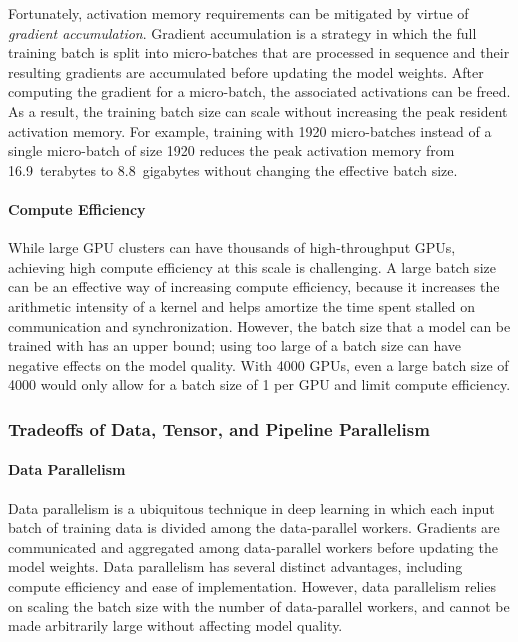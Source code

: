 \documentclass[11pt]{article}
\begin{document}
Fortunately, activation memory requirements can be mitigated by virtue of
\emph{gradient accumulation}. Gradient accumulation is a strategy in which the full training
batch is split into micro-batches that are processed in sequence and their resulting gradients are
accumulated before updating the model weights. After computing the gradient for a micro-batch, the
associated activations can be freed. As a result, the training batch size can scale without
increasing the peak resident activation memory. For example, training with 1920 micro-batches
instead of a single micro-batch of size 1920 reduces the peak activation memory from 16.9~terabytes
to 8.8~gigabytes without changing the effective batch size. 

\paragraph{Compute Efficiency} While large GPU clusters can have thousands of high-throughput
GPUs, achieving high compute efficiency at this scale is challenging. A large batch
size can be an effective way of increasing compute efficiency, because it increases the arithmetic
intensity of a kernel and helps amortize the time spent stalled on communication and synchronization.
However, the batch size that a model can be
trained with has an upper bound; using too large of a batch size can have
negative effects on the model quality. With 4000 GPUs, even a large batch
size of 4000 would only allow for a batch size of 1 per GPU and limit
compute efficiency.


\subsubsection{Tradeoffs of Data, Tensor, and Pipeline Parallelism}

\paragraph{Data Parallelism}
Data parallelism is a ubiquitous technique in deep learning in which
each input batch of training data is divided among the data-parallel workers.
Gradients are communicated and aggregated among data-parallel workers before
updating the model weights.
Data parallelism has
several distinct advantages, including compute efficiency and ease of implementation. However, data parallelism relies on scaling the batch
size with the number of data-parallel workers, and cannot be made arbitrarily
large without affecting model quality.
\end{document}

